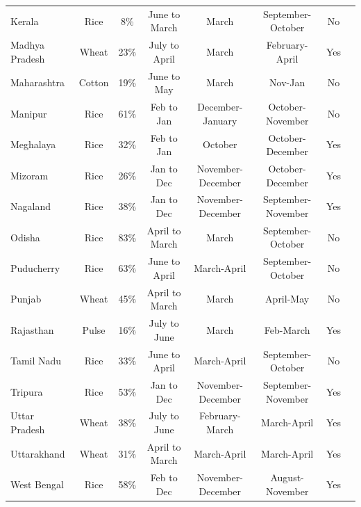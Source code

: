 \documentclass[12pt,letterpaper]{article}\usepackage[margin=1in]{geometry}
\newcommand{\0}{\ensuremath{\mbox{\boldmath $0$}}}
\begin{document}
{\begin{table}[t]
\begin{center}
{{\begin{tabular}{lccccccc}
Kerala &       Rice &        8\% & June to March &      March & September-October &         No \\
Madhya Pradesh &      Wheat &       23\% & July to April &      March & February-April &        Yes \\
Maharashtra &     Cotton &       19\% & June to May &      March &    Nov-Jan &         No \\
Manipur &       Rice &       61\% & Feb to Jan & December-January & October-November &         No \\
Meghalaya &       Rice &       32\% & Feb to Jan &   October  & October-December &        Yes \\
Mizoram &       Rice &       26\% & Jan to Dec & November-December & October-December &        Yes \\
Nagaland &       Rice &       38\% & Jan to Dec & November-December & September-November &        Yes \\
Odisha &       Rice &       83\% & April to March &      March & September-October &         No \\
Puducherry &       Rice &       63\% & June to April & March-April & September-October &         No \\
Punjab &      Wheat &       45\% & April to March &      March &  April-May &         No \\
Rajasthan &      Pulse &       16\% & July to June &      March &  Feb-March &        Yes \\
Tamil Nadu &       Rice &       33\% & June to April & March-April & September-October &         No \\
Tripura &       Rice &       53\% & Jan to Dec & November-December & September-November &        Yes \\
Uttar Pradesh &      Wheat &       38\% & July to June & February-March & March-April &        Yes \\
Uttarakhand &      Wheat &       31\% & April to March & March-April & March-April &        Yes \\
West Bengal &       Rice &       58\% & Feb to Dec & November-December & August-November &        Yes \\
\hline
\end{tabular}}}
\end{center}
\end{table}

}
\end{document}
